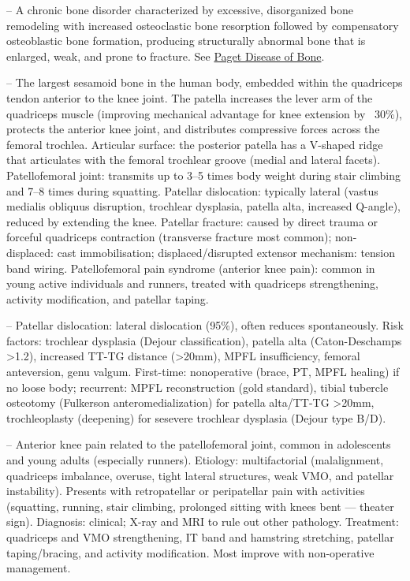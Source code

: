 -- A chronic bone disorder characterized by excessive, disorganized bone remodeling with increased osteoclastic bone resorption followed by compensatory osteoblastic bone formation, producing structurally abnormal bone that is enlarged, weak, and prone to fracture. See \hyperlink{Paget Disease of Bone}{Paget Disease of Bone}.

-- The largest sesamoid bone in the human body, embedded within the quadriceps tendon anterior to the knee joint. The patella increases the lever arm of the quadriceps muscle (improving mechanical advantage for knee extension by ~30\%), protects the anterior knee joint, and distributes compressive forces across the femoral trochlea. Articular surface: the posterior patella has a V-shaped ridge that articulates with the femoral trochlear groove (medial and lateral facets). Patellofemoral joint: transmits up to 3--5 times body weight during stair climbing and 7--8 times during squatting. Patellar dislocation: typically lateral (vastus medialis obliquus disruption, trochlear dysplasia, patella alta, increased Q-angle), reduced by extending the knee. Patellar fracture: caused by direct trauma or forceful quadriceps contraction (transverse fracture most common); non-displaced: cast immobilisation; displaced/disrupted extensor mechanism: tension band wiring. Patellofemoral pain syndrome (anterior knee pain): common in young active individuals and runners, treated with quadriceps strengthening, activity modification, and patellar taping.

-- Patellar dislocation: lateral dislocation (95\%), often reduces spontaneously. Risk factors: trochlear dysplasia (Dejour classification), patella alta (Caton-Deschamps >1.2), increased TT-TG distance (>20mm), MPFL insufficiency, femoral anteversion, genu valgum. First-time: nonoperative (brace, PT, MPFL healing) if no loose body; recurrent: MPFL reconstruction (gold standard), tibial tubercle osteotomy (Fulkerson anteromedialization) for patella alta/TT-TG >20mm, trochleoplasty (deepening) for sesevere trochlear dysplasia (Dejour type B/D).

-- Anterior knee pain related to the patellofemoral joint, common in adolescents and young adults (especially runners). Etiology: multifactorial (malalignment, quadriceps imbalance, overuse, tight lateral structures, weak VMO, and patellar instability). Presents with retropatellar or peripatellar pain with activities (squatting, running, stair climbing, prolonged sitting with knees bent — theater sign). Diagnosis: clinical; X-ray and MRI to rule out other pathology. Treatment: quadriceps and VMO strengthening, IT band and hamstring stretching, patellar taping/bracing, and activity modification. Most improve with non-operative management.

